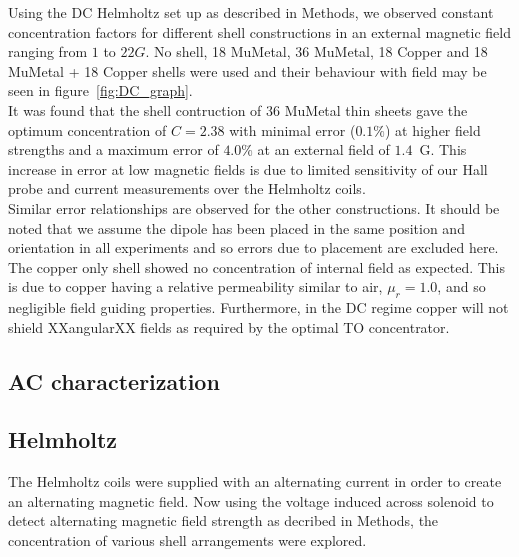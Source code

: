 \documentclass[11pt]{iopart}
\begin{document}
Using the DC Helmholtz set up as described in Methods, we observed
constant concentration factors for different shell constructions in an
external magnetic field ranging from $1$ to $22 G$. No shell, 18
MuMetal, 36 MuMetal, 18 Copper and 18 MuMetal + 18 Copper shells were
used and their behaviour with field may be seen in
figure~\ref{fig:DC_graph}.\\ It was found that the shell contruction of 36
MuMetal thin sheets gave the optimum concentration of $C = 2.38$ with
minimal error ($0.1\%$) at higher field strengths and a maximum error
of $4.0\%$ at an external field of $1.4$~G. This increase in error at
low magnetic fields is due to limited sensitivity of our Hall probe
and current measurements over the Helmholtz coils.\\ Similar error
relationships are observed for the other constructions. It should be
noted that we assume the dipole has been placed in the same position
and orientation in all experiments and so errors due to placement are
excluded here.\\ The copper only shell showed no concentration of
internal field as expected. This is due to copper having a relative
permeability similar to air, $\mu_r = 1.0$, and so negligible field
guiding properties. Furthermore, in the DC regime copper will not
shield XXangularXX fields as required by the optimal TO
concentrator.\\


\subsection{AC characterization}
\begin{figure}
  \caption{}
  \label{fig:AC_helm_graph}
\end{figure}

\subsection{Helmholtz}
The Helmholtz coils were supplied with an alternating current in order
to create an alternating magnetic field.  Now using the voltage
induced across solenoid to detect alternating magnetic field strength
as decribed in Methods, the concentration of various shell
arrangements were explored.\\
\end{document}
